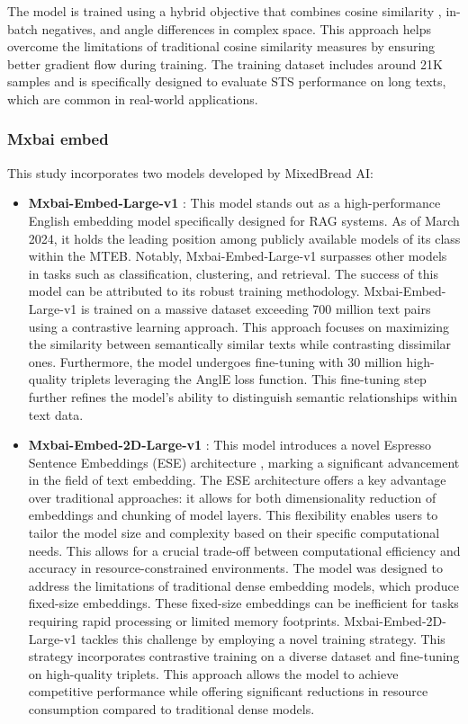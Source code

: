 The model is trained using a hybrid objective that combines cosine similarity , in-batch negatives, and angle differences in complex space.
This approach helps overcome the limitations of traditional cosine similarity  measures by ensuring better gradient flow during training.
The training dataset includes around 21K samples and is specifically designed to evaluate \ac{STS} performance on long texts, which are common in real-world applications.

\subsubsection{Mxbai embed}
This study incorporates two models developed by MixedBread AI:
\begin{itemize}
  \item \textbf{Mxbai-Embed-Large-v1} \cite{emb2024mxbai}:
    This model stands out as a high-performance English embedding model specifically designed for \ac{RAG} systems.
    As of March 2024, it holds the leading position among publicly available models of its class within the \ac{MTEB}.
    Notably, Mxbai-Embed-Large-v1 surpasses other models in tasks such as classification, clustering, and retrieval.
    The success of this model can be attributed to its robust training methodology.
    Mxbai-Embed-Large-v1 is trained on a massive dataset exceeding 700 million text pairs using a contrastive learning approach.
    This approach focuses on maximizing the similarity between semantically similar texts while contrasting dissimilar ones.
    Furthermore, the model undergoes fine-tuning with 30 million high-quality triplets leveraging the AnglE \cite{li2024angleoptimized} loss function.
    This fine-tuning step further refines the model's ability to distinguish semantic relationships within text data.
  \item \textbf{Mxbai-Embed-2D-Large-v1} \cite{emb2024mxbai2d}:
    This model introduces a novel Espresso Sentence Embeddings (ESE) architecture \cite{li2024ese}, marking a significant advancement in the field of text embedding.
    The ESE architecture offers a key advantage over traditional approaches: it allows for both dimensionality reduction of embeddings and chunking of model layers.
    This flexibility enables users to tailor the model size and complexity based on their specific computational needs.
    This allows for a crucial trade-off between computational efficiency and accuracy in resource-constrained environments.
    The model was designed to address the limitations of traditional dense embedding models, which produce fixed-size embeddings.
    These fixed-size embeddings can be inefficient for tasks requiring rapid processing or limited memory footprints.
    Mxbai-Embed-2D-Large-v1 tackles this challenge by employing a novel training strategy.
    This strategy incorporates contrastive training on a diverse dataset and fine-tuning on high-quality triplets.
    This approach allows the model to achieve competitive performance while offering significant reductions in resource consumption compared to traditional dense models.
\end{itemize}

